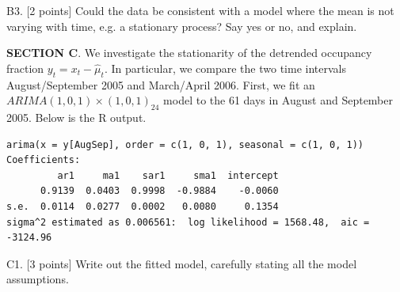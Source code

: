 \documentclass[12pt]{article}
\def\qskip{\vspace{1.5in}}
\begin{document}
\qskip

B3. [2 points] Could the data be consistent with a model where the mean is not varying with time, e.g. a stationary process? Say yes or no, and explain.

\qskip


{\bf SECTION C}. We investigate the stationarity of the detrended occupancy fraction $y_t=x_t-\hat\mu_t$. In particular, we compare the two time intervals  August/September 2005 and March/April 2006.
First, we fit an $ARIMA(1,0,1){\times}(1,0,1)_{24}$ model to the 61 days in August and September 2005. Below is the R output.

\newpage
\begin{verbatim}
arima(x = y[AugSep], order = c(1, 0, 1), seasonal = c(1, 0, 1))
Coefficients:
         ar1     ma1    sar1     sma1  intercept
      0.9139  0.0403  0.9998  -0.9884    -0.0060
s.e.  0.0114  0.0277  0.0002   0.0080     0.1354
sigma^2 estimated as 0.006561:  log likelihood = 1568.48,  aic = -3124.96
\end{verbatim}
C1. [3 points] Write out the fitted model, carefully stating all the model assumptions.

\qskip
\end{document}
